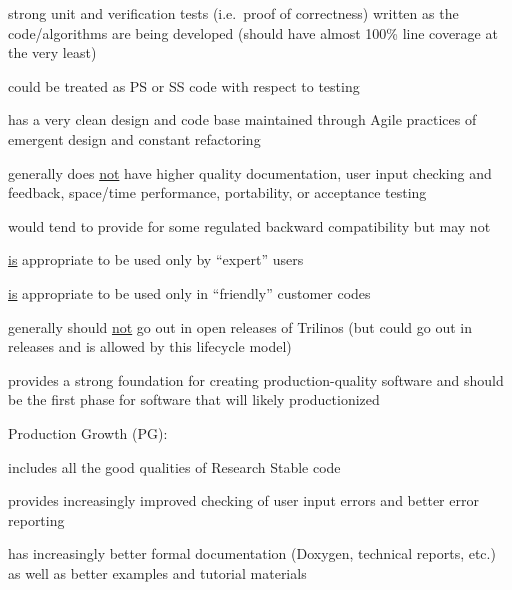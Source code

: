 \documentclass[11pt]{SANDreport}
\begin{document}
\begin{compactenum}
\begin{compactitem}
{}\item strong unit and verification tests (i.e.\ proof of
correctness) written as the code/algorithms are being developed
(should have almost 100\% line coverage at the very least)

{}\item could be treated as PS or SS code with respect to testing

{}\item has a very clean design and code base maintained through Agile
practices of emergent design and constant refactoring

{}\item generally does {}\underline{not} have higher quality
documentation, user input checking and feedback, space/time
performance, portability, or acceptance testing

{}\item would tend to provide for some regulated backward
compatibility but may not

{}\item {}\underline{is} appropriate to be used only by ``expert''
users

{}\item {}\underline{is} appropriate to be used only in ``friendly''
customer codes

{}\item generally should {}\underline{not} go out in open releases of
Trilinos (but could go out in releases and is allowed by this
lifecycle model)

{}\item provides a strong foundation for creating production-quality
software and should be the first phase for software that will likely
productionized

\end{compactitem}

{}\item Production Growth (PG):

\begin{compactitem}

{}\item includes all the good qualities of Research Stable code

{}\item provides increasingly improved checking of user input errors
and better error reporting

{}\item has increasingly better formal documentation (Doxygen,
technical reports, etc.) as well as better examples and tutorial
materials


\end{compactitem}
\end{compactenum}
\end{document}

